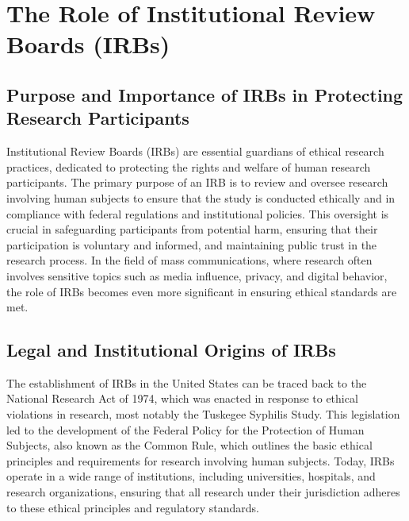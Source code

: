 \documentclass[
]{book}
\begin{document}
\hypertarget{the-role-of-institutional-review-boards-irbs}{%
\section{The Role of Institutional Review Boards (IRBs)}\label{the-role-of-institutional-review-boards-irbs}}

\hypertarget{purpose-and-importance-of-irbs-in-protecting-research-participants}{%
\subsection*{Purpose and Importance of IRBs in Protecting Research Participants}\label{purpose-and-importance-of-irbs-in-protecting-research-participants}}

Institutional Review Boards (IRBs) are essential guardians of ethical research practices, dedicated to protecting the rights and welfare of human research participants. The primary purpose of an IRB is to review and oversee research involving human subjects to ensure that the study is conducted ethically and in compliance with federal regulations and institutional policies. This oversight is crucial in safeguarding participants from potential harm, ensuring that their participation is voluntary and informed, and maintaining public trust in the research process. In the field of mass communications, where research often involves sensitive topics such as media influence, privacy, and digital behavior, the role of IRBs becomes even more significant in ensuring ethical standards are met.

\hypertarget{legal-and-institutional-origins-of-irbs}{%
\subsection*{Legal and Institutional Origins of IRBs}\label{legal-and-institutional-origins-of-irbs}}

The establishment of IRBs in the United States can be traced back to the National Research Act of 1974, which was enacted in response to ethical violations in research, most notably the Tuskegee Syphilis Study. This legislation led to the development of the Federal Policy for the Protection of Human Subjects, also known as the Common Rule, which outlines the basic ethical principles and requirements for research involving human subjects. Today, IRBs operate in a wide range of institutions, including universities, hospitals, and research organizations, ensuring that all research under their jurisdiction adheres to these ethical principles and regulatory standards.
\end{document}
